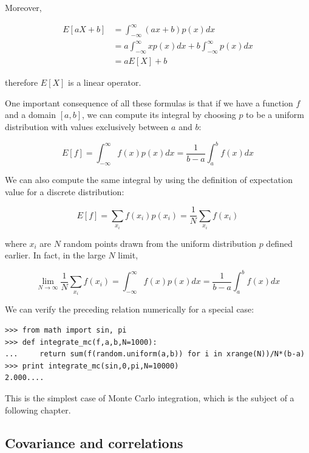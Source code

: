 \documentclass[justified,sixbynine]{tufte-book}
\def\ft{\small\tt}
\theoremstyle{plain}%
\theoremstyle{definition}
\theoremstyle{remark}
\begin{document}
\begin{fullwidth}
Moreover,

\begin{align}
E[aX+b] &= \int_{-\infty }^\infty (ax+b)p(x)dx \\
&= a\int_{-\infty }^\infty xp(x)dx+b\int_{-\infty }^\infty p(x)dx \\
&= aE[X]+b
\end{align}

therefore $E[X]$ is a linear operator.

One important consequence of all these formulas is that if we have a function $f$ and a domain $[a,b]$, we can compute its integral by choosing $p$ to be a uniform distribution with values exclusively between $a$ and $b$:

\begin{equation}
  E[f] = \int_{-\infty }^\infty f(x) p(x) dx = \frac1{b-a}\int_a^b f(x) dx
\end{equation}

We can also compute the same integral by using the definition of expectation value for a discrete distribution:

\begin{equation}
  E[f] = \sum_{x_i} f(x_i) p(x_i) = \frac1N \sum_{x_i} f(x_i)
\end{equation}

where $x_i$ are $N$ random points drawn from the uniform distribution $p$ defined earlier. In fact, in the large $N$ limit,

\begin{equation}
  \lim_{N\rightarrow \infty}  \frac1N \sum_{x_i} f(x_i) = \int_{-\infty }^\infty f(x) p(x)dx = \frac1{b-a}\int_a^b f(x) dx
\end{equation}

We can verify the preceding relation numerically for a special case:

\begin{lstlisting}[caption={in file: {\ft nlib.py}}]
>>> from math import sin, pi
>>> def integrate_mc(f,a,b,N=1000):
...     return sum(f(random.uniform(a,b)) for i in xrange(N))/N*(b-a)
>>> print integrate_mc(sin,0,pi,N=10000)
2.000....
\end{lstlisting}

This is the simplest case of Monte Carlo integration, which is the subject of a following chapter.

\goodbreak\subsection{Covariance and correlations}


\end{fullwidth}
\end{document}
